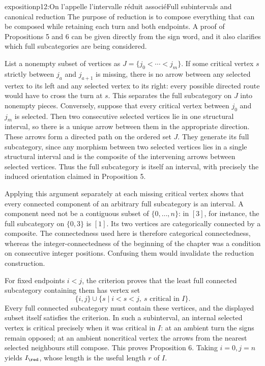 \begin{dcomment}{exposition}{p12:On l'appelle l'intervalle réduit associé}{Full subintervals and canonical reduction}
The purpose of reduction is to compose everything that can be composed while retaining each turn and both endpoints. A proof of Propositions 5 and 6 can be given directly from the sign word, and it also clarifies which full subcategories are being considered.

List a nonempty subset of vertices as $J=\{j_0<\cdots<j_m\}$. If some critical vertex $s$ strictly between $j_a$ and $j_{a+1}$ is missing, there is no arrow between any selected vertex to its left and any selected vertex to its right: every possible directed route would have to cross the turn at $s$. This separates the full subcategory on $J$ into nonempty pieces. Conversely, suppose that every critical vertex between $j_0$ and $j_m$ is selected. Then two consecutive selected vertices lie in one structural interval, so there is a unique arrow between them in the appropriate direction. These arrows form a directed path on the ordered set $J$. They generate its full subcategory, since any morphism between two selected vertices lies in a single structural interval and is the composite of the intervening arrows between selected vertices. Thus the full subcategory is itself an interval, with precisely the induced orientation claimed in Proposition 5.

Applying this argument separately at each missing critical vertex shows that every connected component of an arbitrary full subcategory is an interval. A component need not be a contiguous subset of $\{0,\ldots,n\}$: in $[3]$, for instance, the full subcategory on $\{0,3\}$ is $[1]$. Its two vertices are categorically connected by a composite. The connectedness used here is therefore categorical connectedness, whereas the integer-connectedness of the beginning of the chapter was a condition on consecutive integer positions. Confusing them would invalidate the reduction construction.

For fixed endpoints $i<j$, the criterion proves that the least full connected subcategory containing them has vertex set
\[
\{i,j\}\cup\{s\mid i<s<j,\ s\text{ critical in }I\}.
\]
Every full connected subcategory must contain these vertices, and the displayed subset itself satisfies the criterion. In such a subinterval, an internal selected vertex is critical precisely when it was critical in $I$: at an ambient turn the signs remain opposed; at an ambient noncritical vertex the arrows from the nearest selected neighbours still compose. This proves Proposition 6. Taking $i=0,j=n$ yields $I_{\red}$, whose length is the useful length $r$ of $I$.


\end{dcomment}
